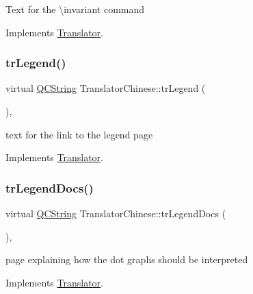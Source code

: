 Text for the \textbackslash{}invariant command 

Implements \mbox{\hyperlink{class_translator}{Translator}}.

\mbox{\label{class_translator_chinese_ab6836224b061ca33dd7531e84db84127}} 
\subsubsection{\texorpdfstring{trLegend()}{trLegend()}}
{\footnotesize\ttfamily virtual \mbox{\hyperlink{class_q_c_string}{Q\+C\+String}} Translator\+Chinese\+::tr\+Legend (\begin{DoxyParamCaption}{ }\end{DoxyParamCaption})\hspace{0.3cm}{\ttfamily [inline]}, {\ttfamily [virtual]}}

text for the link to the legend page 

Implements \mbox{\hyperlink{class_translator}{Translator}}.

\mbox{\label{class_translator_chinese_a4e368073ebc80e931ea9569c9ed39340}} 
\subsubsection{\texorpdfstring{trLegendDocs()}{trLegendDocs()}}
{\footnotesize\ttfamily virtual \mbox{\hyperlink{class_q_c_string}{Q\+C\+String}} Translator\+Chinese\+::tr\+Legend\+Docs (\begin{DoxyParamCaption}{ }\end{DoxyParamCaption})\hspace{0.3cm}{\ttfamily [inline]}, {\ttfamily [virtual]}}

page explaining how the dot graph\textquotesingle{}s should be interpreted 

Implements \mbox{\hyperlink{class_translator}{Translator}}.

\mbox{\label{class_translator_chinese_a51037e46ac3ff06aff64477f0a3593ac}} 
